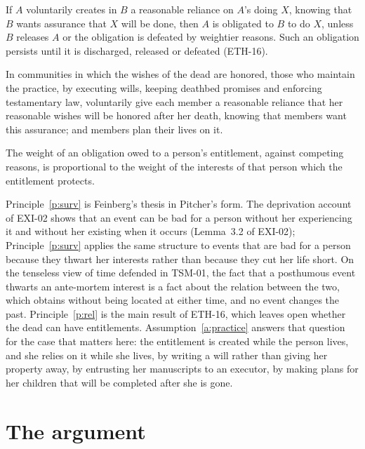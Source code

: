 \documentclass{situationist-preprint}
\begin{document}
\begin{principle}[Reliance]\label{p:rel}
If $A$ voluntarily creates in $B$ a reasonable reliance on $A$'s doing $X$, knowing that $B$ wants assurance that $X$ will be done, then $A$ is obligated to $B$ to do $X$, unless $B$ releases $A$ or the obligation is defeated by weightier reasons. Such an obligation persists until it is discharged, released or defeated (ETH-16).
\end{principle}

\begin{assumption}[Practice]\label{a:practice}
In communities in which the wishes of the dead are honored, those who maintain the practice, by executing wills, keeping deathbed promises and enforcing testamentary law, voluntarily give each member a reasonable reliance that her reasonable wishes will be honored after her death, knowing that members want this assurance; and members plan their lives on it.
\end{assumption}

\begin{assumption}[Weight]\label{a:weight}
The weight of an obligation owed to a person's entitlement, against competing reasons, is proportional to the weight of the interests of that person which the entitlement protects.
\end{assumption}

Principle~\ref{p:surv} is Feinberg's thesis in Pitcher's form. The deprivation account of EXI-02 shows that an event can be bad for a person without her experiencing it and without her existing when it occurs (Lemma~3.2 of EXI-02); Principle~\ref{p:surv} applies the same structure to events that are bad for a person because they thwart her interests rather than because they cut her life short. On the tenseless view of time defended in TSM-01, the fact that a posthumous event thwarts an ante-mortem interest is a fact about the relation between the two, which obtains without being located at either time, and no event changes the past. Principle~\ref{p:rel} is the main result of ETH-16, which leaves open whether the dead can have entitlements. Assumption~\ref{a:practice} answers that question for the case that matters here: the entitlement is created while the person lives, and she relies on it while she lives, by writing a will rather than giving her property away, by entrusting her manuscripts to an executor, by making plans for her children that will be completed after she is gone.

\section{The argument}
\end{document}
